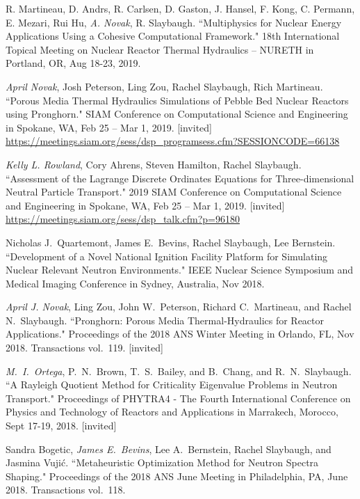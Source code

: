 \begin{bibsection}
\item R. Martineau, D. Andrs, R. Carlsen, D. Gaston, J. Hansel, F. Kong, C. Permann, E. Mezari, Rui Hu, \textit{A. Novak}, R. Slaybaugh. ``Multiphysics for Nuclear Energy Applications Using a Cohesive Computational Framework." 18th International Topical Meeting on Nuclear Reactor Thermal Hydraulics – NURETH in Portland, OR, Aug 18-23, 2019. 

\item \textit{April Novak}, Josh Peterson, Ling Zou, Rachel Slaybaugh, Rich Martineau. ``Porous Media Thermal Hydraulics Simulations of Pebble Bed Nuclear Reactors using Pronghorn." SIAM Conference on Computational Science and Engineering in Spokane, WA, Feb 25 – Mar 1, 2019. [invited]\\
\url{https://meetings.siam.org/sess/dsp_programsess.cfm?SESSIONCODE=66138}

\item \textit{Kelly L. Rowland}, Cory Ahrens, Steven Hamilton, Rachel Slaybaugh. ``Assessment of the Lagrange Discrete Ordinates Equations for Three-dimensional Neutral Particle Transport." 2019 SIAM Conference on Computational Science and Engineering in Spokane, WA, Feb 25 – Mar 1, 2019. [invited]\\
\url{https://meetings.siam.org/sess/dsp_talk.cfm?p=96180}

\item Nicholas J.\ Quartemont, James E.\ Bevins, Rachel Slaybaugh, Lee Bernstein. ``Development of a Novel National Ignition Facility Platform for Simulating Nuclear Relevant Neutron Environments." IEEE Nuclear Science Symposium and Medical Imaging Conference in Sydney, Australia, Nov 2018. 

\item \textit{April J. Novak}, Ling Zou, John W.\ Peterson, Richard C.\ Martineau, and Rachel N.\ Slaybaugh. ``Pronghorn: Porous Media Thermal-Hydraulics for Reactor Applications." Proceedings of the 2018 ANS Winter Meeting in Orlando, FL, Nov 2018. Transactions vol.\ 119. [invited]

\item \textit{M.\ I.\ Ortega}, P.\ N.\ Brown, T.\ S.\ Bailey, and B.\ Chang, and R.\ N.\ Slaybaugh. ``A Rayleigh Quotient Method for Criticality Eigenvalue Problems in Neutron Transport." Proceedings of PHYTRA4 - The Fourth International Conference on Physics and Technology of Reactors and Applications in Marrakech, Morocco, Sept 17-19, 2018. [invited]

\item Sandra Bogetic, \textit{James E.\ Bevins}, Lee A.\ Bernstein, Rachel Slaybaugh, and Jasmina Vuji\'c. ``Metaheuristic Optimization Method for Neutron Spectra Shaping." Proceedings of the 2018 ANS June Meeting in Philadelphia, PA, June 2018. Transactions vol.\ 118. 


\end{bibsection}
